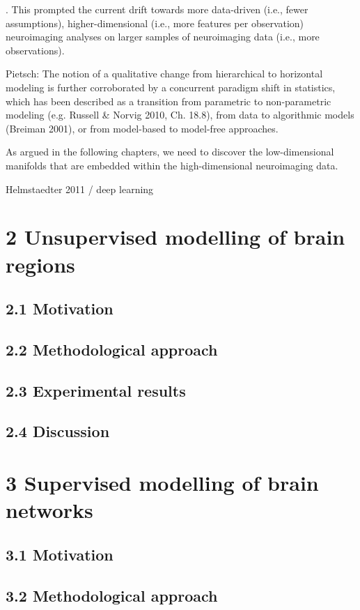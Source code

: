\documentclass[authoryear,review,3p]{elsarticle}
\begin{document}
. This prompted the current drift towards more data-driven (i.e., fewer assumptions), higher-dimensional (i.e., more features per observation) neuroimaging analyses on larger samples of neuroimaging data (i.e., more observations).


Pietsch:
The notion of a qualitative change from hierarchical to horizontal modeling is further corroborated by a concurrent paradigm shift in statistics, which has been described as a transition from parametric to non-parametric modeling (e.g. Russell \& Norvig 2010, Ch. 18.8), from data to algorithmic models (Breiman 2001), or from model-based to model-free approaches.


As argued in the following chapters,
we need to discover
the low-dimensional manifolds that are
embedded within the high-dimensional neuroimaging data.

Helmstaedter 2011 / deep learning


\section*{2 Unsupervised modelling of brain regions}

\subsection*{2.1 Motivation}
\subsection*{2.2 Methodological approach}
\subsection*{2.3 Experimental results}
\subsection*{2.4 Discussion}



\section*{3 Supervised modelling of brain networks}

\subsection*{3.1 Motivation}
\subsection*{3.2 Methodological approach}
\end{document}
